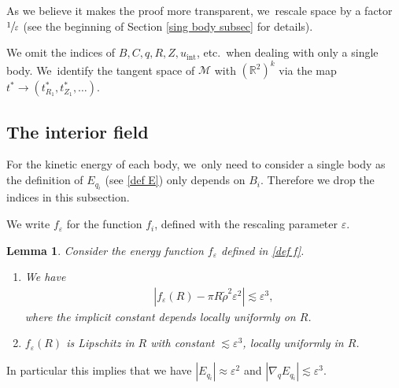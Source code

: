 \documentclass[JEP,XML,SOM,Unicode,published]{cedram}
\let\epsilon\varepsilon
\newtheorem{lemma}[theorem]{Lemma}
\theoremstyle{definition}
\newcommand\R{\mathbb{R}}
\let\eps\epsilon
\begin{document}
As we believe it makes the proof more transparent, we~rescale space by a factor $\sfrac{1}{\eps}$ (see the beginning of Section \ref{sing body subsec} for details).

We omit the indices of $B,C,q, R, Z, u_\mathrm{int}$, etc.\ when dealing with only a single body. We~identify the tangent space of $\mathcal{M}$ with $(\R^2)^k$ via the map $t^*\to (t_{R_1}^*,t_{Z_1}^*,\dots)$.

\subsection{The interior field}

For the kinetic energy of each body, we~only need to consider a single body as the definition of $E_{q_i}$ (see \eqref{def E}) only depends on $B_i$. Therefore we drop the indices in this subsection.

We write $f_\eps$ for the function $f_i$, defined with the rescaling parameter $\eps$.

\begin{lemma}\label{InteriorField}
Consider the energy function $f_\eps$ defined in \eqref{def f}.\begin{enumerate}
\item\label{InteriorFielda}
We have
\begin{align*}
\left|f_\eps(R)-\pi R\tilde{\rho}^2\eps^2\right|\lesssim \eps^3,
\end{align*}
where the implicit constant depends locally uniformly on $R$.

\item\label{InteriorFieldb}
$f_\eps(R)$ is Lipschitz in $R$ with constant $\lesssim \eps^3$, locally uniformly in $R$.
\end{enumerate}
\end{lemma}

In particular this implies that we have $|E_{q_i}|\approx \eps^2$ and $|\nabla_q E_{q_i}|\lesssim \eps^3$.
\end{document}
